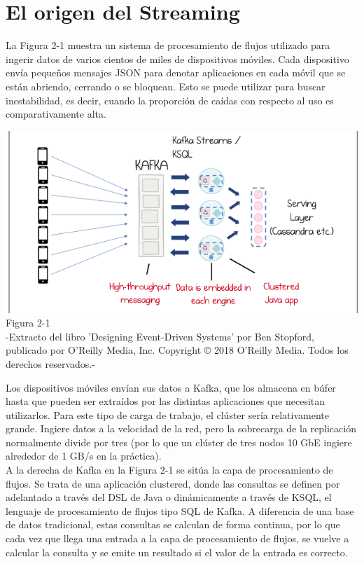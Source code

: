 \documentclass{article}
\begin{document}
\section{El origen del Streaming}
La Figura 2-1 muestra un sistema de procesamiento de flujos utilizado para ingerir datos de varios cientos de miles de dispositivos móviles. Cada dispositivo envía pequeños mensajes JSON para
denotar aplicaciones en cada móvil que se están abriendo, cerrando o se bloquean. Esto se puede utilizar para buscar inestabilidad, es decir, cuando la proporción de caídas con respecto al uso es comparativamente alta.\\
\begin{center}
    \includegraphics[scale=0.8]{figure2.1.png}
    Figura 2-1\\
    -Extracto del libro 'Designing Event-Driven Systems' por Ben Stopford, publicado por O'Reilly Media, Inc. Copyright © 2018 O'Reilly Media. Todos los derechos reservados.-
\end{center}
Los dispositivos móviles envían sus datos a Kafka, que los almacena en búfer hasta que pueden ser extraídos por las distintas aplicaciones que necesitan utilizarlos. Para este
tipo de carga de trabajo, el clúster sería relativamente grande.
Ingiere datos a la velocidad de la red, pero la sobrecarga de la replicación normalmente divide
por tres (por lo que un clúster de tres nodos 10 GbE ingiere alrededor de 1 GB/s en la práctica).\\

A la derecha de Kafka en la Figura 2-1 se sitúa la capa de procesamiento de flujos. Se trata de una aplicación clustered, donde las consultas se definen por adelantado a través del DSL de Java o
dinámicamente a través de KSQL, el lenguaje de procesamiento de flujos tipo SQL de Kafka. A diferencia de una
base de datos tradicional, estas consultas se calculan de forma continua, por lo que
cada vez que llega una entrada a la capa de procesamiento de flujos, se vuelve a calcular la consulta y se emite un resultado si el valor de la entrada es correcto.\\
\end{document}
